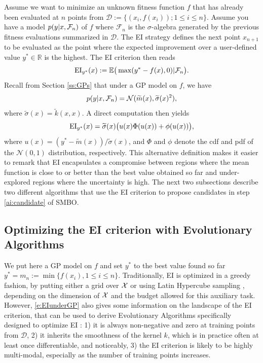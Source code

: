 \documentclass{article}
\newcommand{\vs}[1]{\vspace*{-#1mm}}
\newcommand{\Bss}{\vs{1}}
\newcommand{\ass}{\vs{0.7}}
\begin{document}
Assume we want to minimize an unknown fitness function $f$ that has already
been evaluated at $n$ points from $\mathcal{D}:=\{(x_i,f(x_i)) ; 1\leq
i\leq n\}.$ Assume you have a model $p(y\vert x,{\cal F}_n)$ of $f$ where
$\mathcal{F}_n$ is the $\sigma$-algebra generated by the previous
fitness evaluations summarized in $\mathcal{D}$. The EI strategy
defines the next point $x_{n+1}$ to be
evaluated as the point where the expected improvement over 
a user-defined value $y^*\in\mathbb{R}$ is the highest. The EI
criterion then reads
\begin{equation}
\vs{.5}
\text{EI}_{y^*}(x):=\mathbb{E}\big(\max(y^*-f(x),0)\vert \mathcal{F}_n\big).
\label{e:EI}
\vs{.5}
\end{equation}
Recall from Section \ref{ss:GPs} that under a GP model on $f$, we have 
$$p(y\vert x,{\cal F}_n) = {\cal N}(\widetilde{m}(x),\widetilde{\sigma}(x)^2),$$ 
where $\tilde\sigma(x) = \tilde{k}(x,x)$. A direct computation then yields
\begin{equation}\label{e:EIunderGP}
\vs{.5}
 \text{EI}_{y^*}(x)=\widetilde{\sigma}(x)\big(u(x)\Phi(u(x))+\phi(u(x))\big),
\vs{.5}
\end{equation}
where $u(x)=(y^*-\widetilde{m}(x))/\widetilde{\sigma}(x)$, and $\Phi$ and
$\phi$ denote the cdf and pdf of the $\mathcal{N}(0,1)$ distribution,
respectively. This alternative definition makes it easier to remark that EI
encapsulates a compromise between regions where the mean function is
close to or better than the best value obtained so far and
under-explored regions
where the uncertainty is high. The next two subsections describe two different
algorithms that use the EI criterion to propose candidates in step
\ref{ai:candidate} of SMBO.

\Bss
\subsection{Optimizing the EI criterion with Evolutionary Algorithms}
\ass
\label{ss:ea}

We put here a GP model on $f$ and set $y^*$ to the best value found so far $y^*=m_n:=\min\{
f(x_i),1\leq i\leq n\}$. Traditionally, EI is optimized in a greedy fashion, by putting
either a grid over ${\cal X}$ or using Latin Hypercube sampling \cite{ViVaWa06},
depending on the dimension of ${\cal X}$ and the budget allowed for this
auxiliary task. However, \eqref{e:EIunderGP}
also gives some information on the landscape of the EI criterion, that can be
used to derive Evolutionary Algorithms specifically designed to
optimize EI \citep{BaKe10}: 1) it is
always non-negative and zero at training points from $\mathcal{D}$, 2) it
inherits the smoothness of the kernel $k$, which is
in practice often at least once differentiable, and noticeably, 3) the
EI criterion is likely to be highly multi-modal, especially as the number of
training points increases. 
\end{document}
